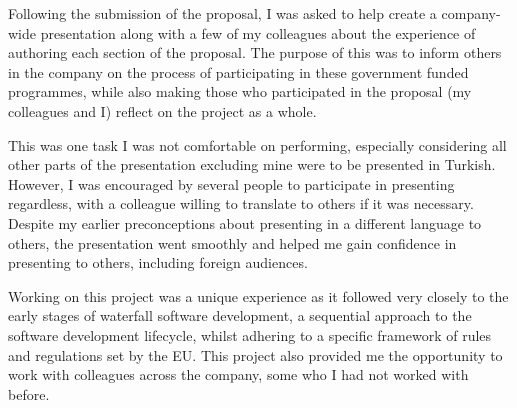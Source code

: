 Following the submission of the proposal, I was asked to help create a company-wide presentation
along with a few of my colleagues about the experience of authoring each section of the proposal.
The purpose of this was to inform others in the company on the process of participating in these
government funded programmes, while also making those who participated in the proposal (my
colleagues and I) reflect on the project as a whole.

This was one task I was not comfortable on performing, especially considering all other parts of the
presentation excluding mine were to be presented in Turkish. However, I was encouraged by several
people to participate in presenting regardless, with a colleague willing to translate to others if
it was necessary. Despite my earlier preconceptions about presenting in a different language to
others, the presentation went smoothly and helped me gain confidence in presenting to others,
including foreign audiences.

Working on this project was a unique experience as it followed very closely to the early stages of
waterfall software development, a sequential approach to the software development lifecycle, whilst
adhering to a specific framework of rules and regulations set by the EU\@. This project also
provided me the opportunity to work with colleagues across the company, some who I had not worked
with before.
